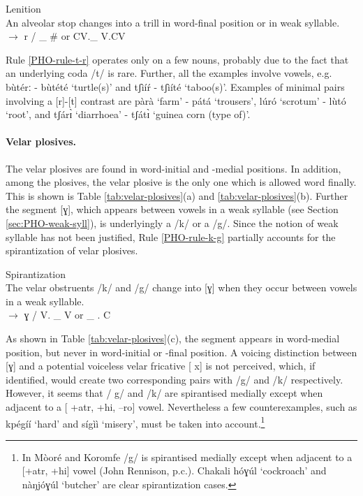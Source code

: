 \begin{Rule}\label{PHO-rule-t-r}{Lenition}\\
An  alveolar stop changes into a  trill in word-final position or in weak
syllable.\\
 {} $\rightarrow$  r   /   \_ \#  or  CV.\_ V.CV
\end{Rule}

Rule \ref{PHO-rule-t-r} operates  only on a few nouns, probably due to the fact 
that an underlying coda /t/ is rare.  Further,  all the examples involve {\sc 
[+atr, --ro]} vowels,  e.g. {\sls bùtérː} - {\sls bùtété} `turtle(s)' and 
{\sls tʃìíŕ} - {\sls tʃìíté} `taboo(s)'.  Examples of minimal pairs 
involving 
a [r]-[t] contrast are  {\sls pàrà}  `farm' -  {\sls pátá}  `trousers', 
{\sls lúró} `scrotum' - {\sls lùtó} `root', and {\sls tʃárɪ̀} 
`diarrhoea' - {\sls tʃátɪ̀} `guinea corn (type of)'.


\paragraph{Velar plosives.}
\label{sec:PHO-vel-plos}  

The velar plosives are found in word-initial and -medial positions. In addition, 
among the plosives,  the velar plosive is the only one which is allowed word 
finally. This is shown is Table \ref{tab:velar-plosives}(a)  and 
\ref{tab:velar-plosives}(b). Further the segment [{\sls ɣ}], which appears 
between vowels in a weak syllable (see Section \ref{sec:PHO-weak-syll}),  is 
underlyingly a /{\sls k}/ or a  /{\sls g}/. Since the notion of weak syllable 
has 
not been justified, Rule \ref{PHO-rule-k-g} partially accounts for the 
spirantization  of velar plosives.


\begin{Rule}\label{PHO-rule-k-g}{Spirantization}\\
The velar obstruents  /{\sls  k}/ and /{\sls  g}/  change into  [{\sls  ɣ}]  
when they occur
between vowels in a weak syllable.\\
{}  $\rightarrow$  {\sls ɣ}  /  V. \_ V or  \_ . C
\end{Rule}


As shown in Table \ref{tab:velar-plosives}(c), the segment {\sls [ɣ]} appears 
in 
word-medial position, but never in word-initial or  -final position.  A  voicing 
distinction between [{\sls ɣ}] and a potential voiceless velar fricative [{\sls 
x}] is not perceived, which,  if identified, would create two corresponding 
pairs with /{\sls g}/ and /{\sls k}/ respectively. However, it seems that 
/{\sls 
g}/ and /{\sls k}/ are spirantised medially except when adjacent to a [{\sc 
+atr}, {\sc +hi}, {\sc --ro}] vowel. Nevertheless a few counterexamples, such as 
{\sls kpégíí} `hard' and {\sls sígìì} `misery',  must be taken into 
account.\footnote{In Mòoré and Koromfe /{\sls g}/ is spirantised medially 
except when adjacent to a [{\sc +atr}, {\sc +hi}] vowel  (John Rennison, p.c.). 
Chakali  {\sls hóɣúl} `cockroach' and {\sls nàŋjóɣúl} `butcher'  are clear 
spirantization cases.}





